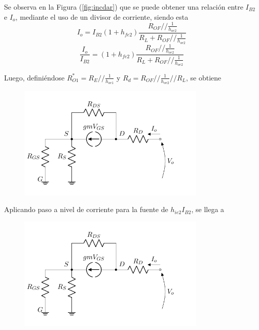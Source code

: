 Se observa en la Figura (\ref{fig:incdar}) que se puede obtener una relación entre $I_{B2}$ e $I_o$, mediante el uso de un divisor de corriente, siendo esta
\begin{equation*}
	I_o = I_{B2} \left( 1 + h_{fe2} \right) \frac{R_{OF} // \frac{1}{h_{oe2}}}{R_L + R_{OF} // \frac{1}{h_{oe2}}}
\end{equation*}
\begin{equation}
	\frac{I_o}{I_{B2}} = \left( 1 + h_{fe2} \right) \frac{R_{OF} // \frac{1}{h_{oe2}}}{R_L + R_{OF} // \frac{1}{h_{oe2}}}
	\label{equ:io-ib2}
\end{equation}

Luego, definiéndose $R_{O1}^{*} = R_{E} // \frac{1}{h_{oe1}}$ y $R_d = R_{OF} // \frac{1}{h_{oe2}} // R_L$, se obtiene
\begin{figure}[H]
\centering
	\includegraphics[width=0.8\textwidth, page=4]{Imagenes/ModeloIncremental.pdf}
\end{figure}

Aplicando paso a nivel de corriente para la fuente de $h_{ie2} I_{B2}$, se llega a
\begin{figure}[H]
\centering
	\includegraphics[width=0.8\textwidth, page=5]{Imagenes/ModeloIncremental.pdf}
\end{figure}

